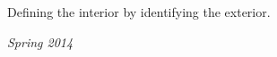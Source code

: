 Defining the interior by identifying the exterior.

\begin{flushright}
\textit{Spring 2014}
\end{flushright}




\groupendnotes

